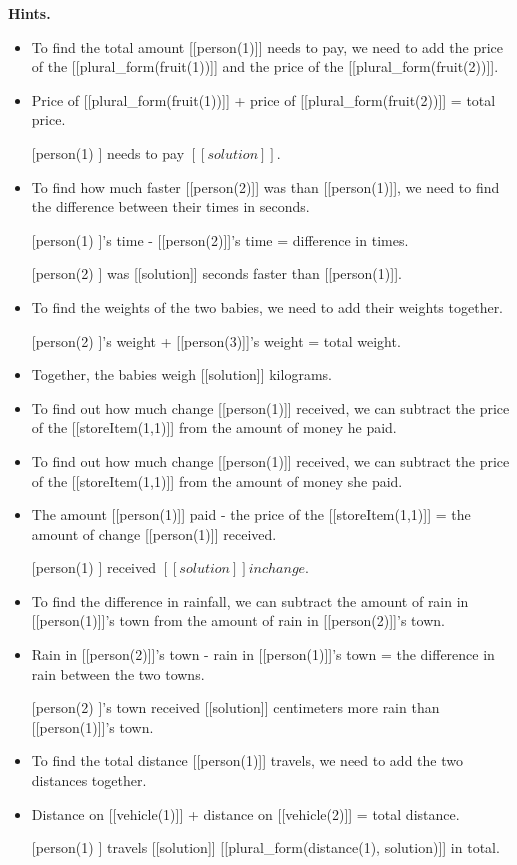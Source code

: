 \documentclass{article}
\begin{document}
\textbf{Hints.}
\begin{itemize}
  \item To find the total amount [[person(1)]] needs to pay,
                    we need to add the price of the [[plural\_form(fruit(1))]] and the price of the [[plural\_form(fruit(2))]].
  \item Price of [[plural\_form(fruit(1))]] + price of [[plural\_form(fruit(2))]] = total price.
  \item [[person(1)]] needs to pay $[[solution]].$
  \item To find how much faster [[person(2)]] was than [[person(1)]],
                    we need to find the difference between their times in seconds.
  \item [[person(1)]]'s time - [[person(2)]]'s time = difference in times.
  \item [[person(2)]] was [[solution]] seconds faster than [[person(1)]].
  \item To find the weights of the two babies, we need to add their weights together.
  \item [[person(2)]]'s weight + [[person(3)]]'s weight = total weight.
  \item Together, the babies weigh [[solution]] kilograms.
  \item To find out how much change [[person(1)]] received, we can subtract the price of the
                    [[storeItem(1,1)]] from the amount of money he paid.
  \item To find out how much change [[person(1)]] received, we can subtract the price of the
                    [[storeItem(1,1)]] from the amount of money she paid.
  \item The amount [[person(1)]] paid - the price of the [[storeItem(1,1)]] = 
                    the amount of change [[person(1)]] received.
  \item [[person(1)]] received $[[solution]] in change.$
  \item To find the difference in rainfall, we can subtract the amount of rain in [[person(1)]]'s
                    town from the amount of rain in [[person(2)]]'s town.
  \item Rain in [[person(2)]]'s town - rain in [[person(1)]]'s town = the difference in rain between the two towns.
  \item [[person(2)]]'s town received [[solution]] centimeters more rain than [[person(1)]]'s town.
  \item To find the total distance [[person(1)]] travels, we need to add the two distances together.
  \item Distance on [[vehicle(1)]] + distance on [[vehicle(2)]] = total distance.
  \item [[person(1)]] travels [[solution]] [[plural\_form(distance(1), solution)]] in total.
\end{itemize}
\end{document}
